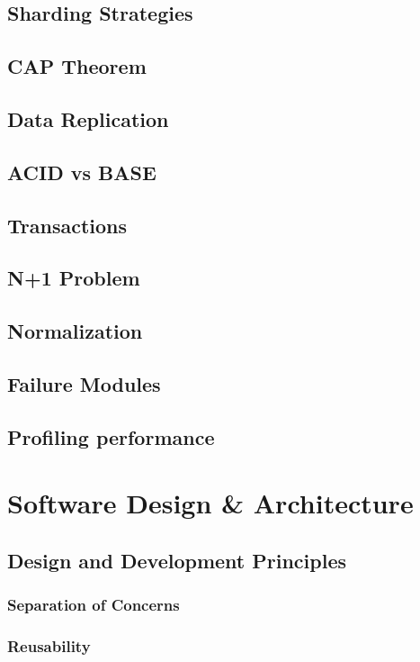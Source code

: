 \documentclass[a4paper]{article}
\begin{document}
    \subsection{Sharding Strategies}
    \subsection{CAP Theorem}
    \subsection{Data Replication}
    \subsection{ACID vs BASE}
    \subsection{Transactions}
    \subsection{N+1 Problem}
    \subsection{Normalization}
    \subsection{Failure Modules}
    \subsection{Profiling performance}
    
    
    \newpage
    \section{Software Design \& Architecture}
    \subsection{Design and Development Principles}
    \subsubsection{Separation of Concerns}
    \subsubsection{Reusability}
\end{document}
